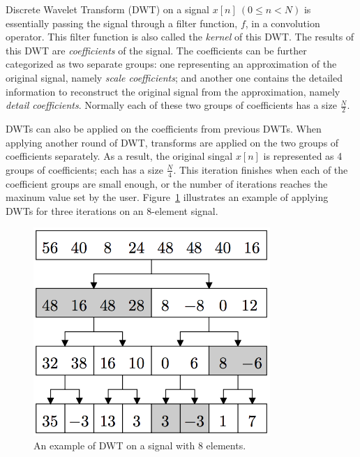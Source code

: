 Discrete Wavelet Transform (DWT) on a signal $x[n] \: (0 \leq n < N)$ is essentially
passing the signal through a filter function, $f$, 
in a convolution operator.
%
This filter function is also called the \textit{kernel} of this DWT.
%
The results of this DWT are \textit{coefficients} of the signal.
%
The coefficients can be further categorized as two separate groups: 
one representing an approximation of the original signal,
namely \textit{scale coefficients};
and another one contains the detailed information to reconstruct
the original signal from the approximation, namely 
\textit{detail coefficients}.
%
Normally each of these two groups of coefficients has a size $\frac{N}{2}$.


DWTs can also be applied on the coefficients from previous DWTs.
%
When applying another round of DWT, transforms are applied on the two
groups of coefficients separately.
%
As a result, the original singal $x[n]$ is represented as 4 groups of 
coefficients; each has a size $\frac{N}{4}$.
%
This iteration finishes when each of the coefficient groups are small enough,
or the number of iterations reaches the maxinum value set by the user. 
%
%
%
Figure~\ref{fig:example1} illustrates an example of applying DWTs for 
three iterations on an 8-element signal.



\begin{figure}
    \centering
    \includegraphics[width=0.8\textwidth]{fig/example1.png}
    \caption{An example of DWT on a signal with 8 elements.}
    \label{fig:example1}
\end{figure}


